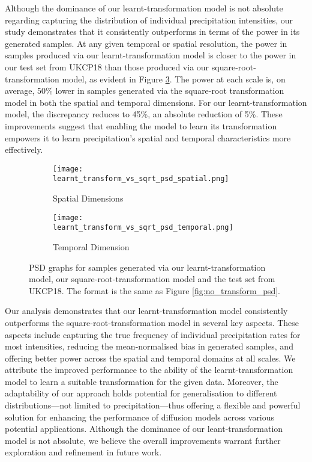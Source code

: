 \documentclass[ oneside,%
                    author={George Herbert},
                    degree={MSci},
                     title={Video Diffusion Models for Climate Simulations},
                  subtitle={}]{dissertation}
\begin{document}
Although the dominance of our learnt-transformation model is not absolute regarding capturing the distribution of individual precipitation intensities, our study demonstrates that it consistently outperforms in terms of the power in its generated samples. At any given temporal or spatial resolution, the power in samples produced via our learnt-transformation model is closer to the power in our test set from UKCP18 than those produced via our square-root-transformation model, as evident in Figure \ref{fig:learnt_transform_vs_sqrt_psd}. The power at each scale is, on average, 50\% lower in samples generated via the square-root transformation model in both the spatial and temporal dimensions. For our learnt-transformation model, the discrepancy reduces to 45\%, an absolute reduction of 5\%. These improvements suggest that enabling the model to learn its transformation empowers it to learn precipitation's spatial and temporal characteristics more effectively.

\begin{figure}[htbp]
      \centering
      \begin{subfigure}{.49\textwidth}
            \texttt{[image: learnt\_transform\_vs\_sqrt\_psd\_spatial.png]}
            \caption{Spatial Dimensions}
            \label{fig:learnt_transform_vs_sqrt_psd_spatial}
      \end{subfigure}
      \begin{subfigure}{.49\textwidth}
            \texttt{[image: learnt\_transform\_vs\_sqrt\_psd\_temporal.png]}
            \caption{Temporal Dimension}
            \label{fig:learnt_transform_vs_sqrt_psd_temporal}
      \end{subfigure}
      \caption{PSD graphs for samples generated via our learnt-transformation model, our square-root-transformation model and the test set from UKCP18. The format is the same as Figure \ref{fig:no_transform_psd}.}
      \label{fig:learnt_transform_vs_sqrt_psd}
\end{figure}

Our analysis demonstrates that our learnt-transformation model consistently outperforms the square-root-transformation model in several key aspects. These aspects include capturing the true frequency of individual precipitation rates for most intensities, reducing the mean-normalised bias in generated samples, and offering better power across the spatial and temporal domains at all scales. We attribute the improved performance to the ability of the learnt-transformation model to learn a suitable transformation for the given data. Moreover, the adaptability of our approach holds potential for generalisation to different distributions---not limited to precipitation---thus offering a flexible and powerful solution for enhancing the performance of diffusion models across various potential applications. Although the dominance of our leant-transformation model is not absolute, we believe the overall improvements warrant further exploration and refinement in future work.
\end{document}
